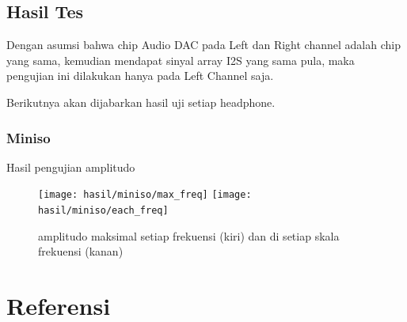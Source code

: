 \documentclass[12pt,]{article}
\begin{document}
	\subsection{Hasil Tes}
	
	Dengan asumsi bahwa chip Audio DAC pada Left dan Right channel adalah chip yang sama,
	kemudian mendapat sinyal array I2S yang sama pula,
	maka pengujian ini dilakukan hanya pada Left Channel saja.
	
	Berikutnya akan dijabarkan hasil uji setiap headphone.
	
  	\subsubsection{Miniso}
	
	Hasil pengujian amplitudo
	
	\begin{figure}[!ht]
		\centering
		\texttt{[image: hasil/miniso/max\_freq]}
		\texttt{[image: hasil/miniso/each\_freq]}
		\caption{amplitudo maksimal setiap frekuensi (kiri) dan di setiap skala frekuensi (kanan)}
	\end{figure}
	
	\newpage
	\section{Referensi}
	\label{}
	
	
	
		
\end{document}
